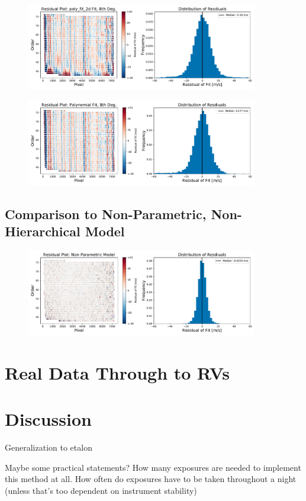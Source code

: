 \documentclass[12pt, letterpaper]{article}
\begin{document}
\begin{figure}[h]
\centering
\includegraphics[width=0.9\textwidth]{Figures/polyval2d.pdf}
\caption{}
\label{fig:polyValFit}
\end{figure} 

\begin{figure}[h]
\centering
\includegraphics[width=0.9\textwidth]{Figures/designMatrix.pdf}
\caption{}
\label{fig:dsnMFit}
\end{figure} 

\subsection{Comparison to Non-Parametric, Non-Hierarchical Model}

\begin{figure}[h]
\centering
\includegraphics[width=0.9\textwidth]{Figures/noHierc.pdf}
\caption{}
\label{fig:intpFit}
\end{figure} 

\section{Real Data Through to RVs} \label{sec:realdata}

\section{Discussion} \label{sec:discussion}
Generalization to etalon

Maybe some practical statements?  How many exposures are needed to implement this method at all.  How often do exposures have to be taken throughout a night (unless that's too dependent on instrument stability)
\end{document}
